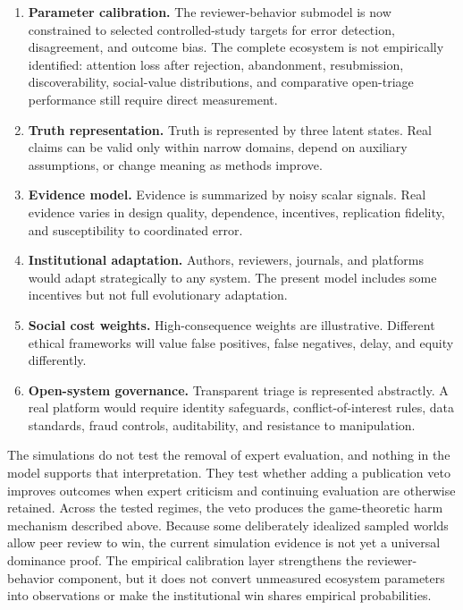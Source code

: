 \begin{enumerate}
    \item \textbf{Parameter calibration.} The reviewer-behavior submodel is now constrained to selected controlled-study targets for error detection, disagreement, and outcome bias. The complete ecosystem is not empirically identified: attention loss after rejection, abandonment, resubmission, discoverability, social-value distributions, and comparative open-triage performance still require direct measurement.
    \item \textbf{Truth representation.} Truth is represented by three latent states. Real claims can be valid only within narrow domains, depend on auxiliary assumptions, or change meaning as methods improve.
    \item \textbf{Evidence model.} Evidence is summarized by noisy scalar signals. Real evidence varies in design quality, dependence, incentives, replication fidelity, and susceptibility to coordinated error.
    \item \textbf{Institutional adaptation.} Authors, reviewers, journals, and platforms would adapt strategically to any system. The present model includes some incentives but not full evolutionary adaptation.
    \item \textbf{Social cost weights.} High-consequence weights are illustrative. Different ethical frameworks will value false positives, false negatives, delay, and equity differently.
    \item \textbf{Open-system governance.} Transparent triage is represented abstractly. A real platform would require identity safeguards, conflict-of-interest rules, data standards, fraud controls, auditability, and resistance to manipulation.
\end{enumerate}

The simulations do not test the removal of expert evaluation, and nothing in the model supports that interpretation. They test whether adding a publication veto improves outcomes when expert criticism and continuing evaluation are otherwise retained. Across the tested regimes, the veto produces the game-theoretic harm mechanism described above. Because some deliberately idealized sampled worlds allow peer review to win, the current simulation evidence is not yet a universal dominance proof. The empirical calibration layer strengthens the reviewer-behavior component, but it does not convert unmeasured ecosystem parameters into observations or make the institutional win shares empirical probabilities.

